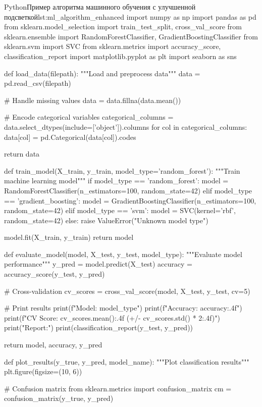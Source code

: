\begin{CodeBlock}{Python}{Пример алгоритма машинного обучения с улучшенной подсветкой}{lst:ml_algorithm_enhanced}
import numpy as np
import pandas as pd
from sklearn.model_selection import train_test_split, cross_val_score
from sklearn.ensemble import RandomForestClassifier, GradientBoostingClassifier
from sklearn.svm import SVC
from sklearn.metrics import accuracy_score, classification_report
import matplotlib.pyplot as plt
import seaborn as sns

def load_data(filepath):
    """Load and preprocess data"""
    data = pd.read_csv(filepath)
    
    # Handle missing values
    data = data.fillna(data.mean())
    
    # Encode categorical variables
    categorical_columns = data.select_dtypes(include=['object']).columns
    for col in categorical_columns:
        data[col] = pd.Categorical(data[col]).codes
    
    return data

def train_model(X_train, y_train, model_type='random_forest'):
    """Train machine learning model"""
    if model_type == 'random_forest':
        model = RandomForestClassifier(n_estimators=100, random_state=42)
    elif model_type == 'gradient_boosting':
        model = GradientBoostingClassifier(n_estimators=100, random_state=42)
    elif model_type == 'svm':
        model = SVC(kernel='rbf', random_state=42)
    else:
        raise ValueError("Unknown model type")
    
    model.fit(X_train, y_train)
    return model

def evaluate_model(model, X_test, y_test, model_type):
    """Evaluate model performance"""
    y_pred = model.predict(X_test)
    accuracy = accuracy_score(y_test, y_pred)
    
    # Cross-validation
    cv_scores = cross_val_score(model, X_test, y_test, cv=5)
    
    # Print results
    print(f"Model: {model_type}")
    print(f"Accuracy: {accuracy:.4f}")
    print(f"CV Score: {cv_scores.mean():.4f} (+/- {cv_scores.std() * 2:.4f})")
    print("\nClassification Report:")
    print(classification_report(y_test, y_pred))
    
    return model, accuracy, y_pred

def plot_results(y_true, y_pred, model_name):
    """Plot classification results"""
    plt.figure(figsize=(10, 6))
    
    # Confusion matrix
    from sklearn.metrics import confusion_matrix
    cm = confusion_matrix(y_true, y_pred)
    

\end{CodeBlock}
